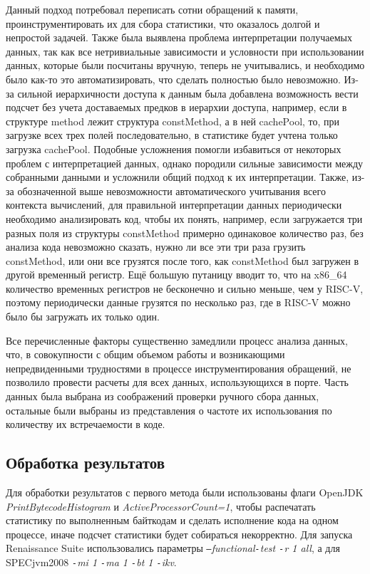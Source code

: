 Данный подход потребовал переписать сотни обращений к памяти, проинструментировать их для сбора статистики, что оказалось долгой и непростой задачей. Также была выявлена проблема интерпретации получаемых данных, так как все нетривиальные зависимости и условности при использовании данных, которые были посчитаны вручную, теперь не учитывались, и необходимо было как-то это автоматизировать, что сделать полностью было невозможно. Из-за сильной иерархичности доступа к данным была добавлена возможность вести подсчет без учета доставаемых предков в иерархии доступа, например, если в структуре method лежит структура constMethod, а в ней cachePool, то, при загрузке всех трех полей последовательно, в статистике будет учтена только загрузка cachePool. Подобные усложнения помогли избавиться от некоторых проблем с интерпретацией данных, однако породили сильные зависимости между собранными данными и усложнили общий подход к их интерпретации. Также, из-за обозначенной выше невозможности автоматического учитывания всего контекста вычислений, для правильной интерпретации данных периодически необходимо анализировать код, чтобы их понять, например, если загружается три разных поля из структуры constMethod примерно одинаковое количество раз, без анализа кода невозможно сказать, нужно ли все эти три раза грузить constMethod, или они все грузятся после того, как constMethod был загружен в другой временный регистр. Ещё большую путаницу вводит то, что на x86\_64 количество временных регистров не бесконечно и сильно меньше, чем у RISC-V, поэтому периодически данные грузятся по несколько раз, где в RISC-V можно было бы загружать их только один.

Все перечисленные факторы существенно замедлили процесс анализа данных, что, в совокупности с общим объемом работы и возникающими непредвиденными трудностями в процессе инструментирования обращений, не позволило провести расчеты для всех данных, использующихся в порте. Часть данных была выбрана из соображений проверки ручного сбора данных, остальные были выбраны из представления о частоте их использования по количеству их встречаемости в коде.



\subsection{Обработка результатов}

Для обработки результатов с первого метода были использованы флаги OpenJDK \textit{PrintBytecodeHistogram} и \textit{ActiveProcessorCount=1}, чтобы распечатать статистику по выполненным байткодам и сделать исполнение кода на одном процессе, иначе подсчет статистики будет собираться некорректно. Для запуска Renaissance Suite использовались параметры \textit{\texttt{--}functional\texttt{-}test \texttt{-}r 1 all}, а для SPECjvm2008 \textit{\texttt{-}mi 1 \texttt{-}ma 1 \texttt{-}bt 1 \texttt{-}ikv}.

